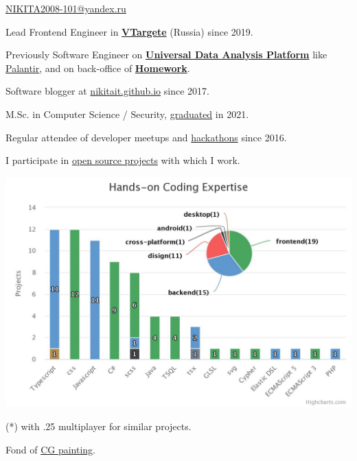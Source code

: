 \documentclass{yb}
\begin{document}
\ybPrintPhoto{}

{\scshape\bfseries\Large {}}\newline
\href{mailto:NIKITA2008-101@yandex.ru}{NIKITA2008-101@yandex.ru}

\vspace*{1em}

Lead Frontend Engineer in \href{https://vtargete.ru/}{\textbf{VTargete}} (Russia) \newline
since 2019.

\vspace*{1em}

Previously Software Engineer on \textbf{\href{https://baltinfocom.ru/BigData\#en}{Universal Data Analysis Platform}} like \href{https://www.palantir.com/}{Palantir}, and on back-office of \textbf{\href{https://homework.ru}{Homework}}.

Software blogger at \href{https://nikitait.github.io/}{nikitait.github.io} since 2017.

M.Sc. in Computer Science / Security, \href{https://etu.ru/en/university/}{graduated} in 2021.

Regular attendee of developer meetups and \href{https://www.youtube.com/watch?v=gVKDU043EWI&t=1s&ab_channel=EPAMSaint-Petersburg}{hackathons} since 2016.

I participate in \href{https://github.com/nikitait}{open source projects} with which I work.

\includegraphics[width=\textwidth]{./hands-on-coding-expertis.jpeg}

(*) with .25 multiplayer for similar projects.


Fond of \href{https://www.artstation.com/nikitait}{CG painting}.
\end{document}
